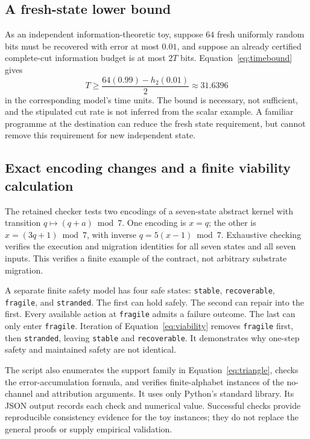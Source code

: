 \documentclass[11pt,a4paper]{article}
\theoremstyle{definition}
\theoremstyle{remark}
\begin{document}
\subsection{A fresh-state lower bound}
As an independent information-theoretic toy, suppose $64$ fresh uniformly random bits must be recovered with error at most $0.01$, and suppose an already certified complete-cut information budget is at most $2T$ bits. Equation~\eqref{eq:timebound} gives
\[
 T\geq\frac{64(0.99)-h_2(0.01)}{2}\approx31.6396
\]
in the corresponding model's time units. The bound is necessary, not sufficient, and the stipulated cut rate is not inferred from the scalar example. A familiar programme at the destination can reduce the fresh state requirement, but cannot remove this requirement for new independent state.

\subsection{Exact encoding changes and a finite viability calculation}
The retained checker tests two encodings of a seven-state abstract kernel with transition $q\mapsto(q+a)\bmod7$. One encoding is $x=q$; the other is $x=(3q+1)\bmod7$, with inverse $q=5(x-1)\bmod7$. Exhaustive checking verifies the execution and migration identities for all seven states and all seven inputs. This verifies a finite example of the contract, not arbitrary substrate migration.

A separate finite safety model has four safe states: \texttt{stable}, \texttt{recoverable}, \texttt{fragile}, and \texttt{stranded}. The first can hold safely. The second can repair into the first. Every available action at \texttt{fragile} admits a failure outcome. The last can only enter \texttt{fragile}. Iteration of Equation~\eqref{eq:viability} removes \texttt{fragile} first, then \texttt{stranded}, leaving \texttt{stable} and \texttt{recoverable}. It demonstrates why one-step safety and maintained safety are not identical.

The script also enumerates the support family in Equation~\eqref{eq:triangle}, checks the error-accumulation formula, and verifies finite-alphabet instances of the no-channel and attribution arguments. It uses only Python's standard library. Its JSON output records each check and numerical value. Successful checks provide reproducible consistency evidence for the toy instances; they do not replace the general proofs or supply empirical validation.

\Needspace{0.18\textheight}
\end{document}
